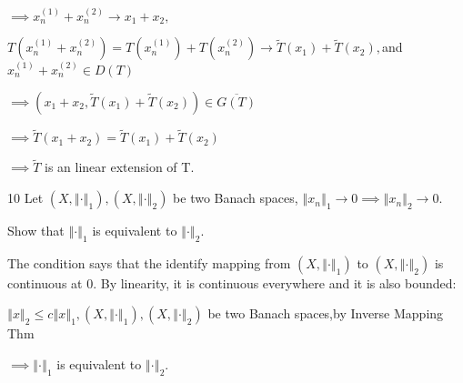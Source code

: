 \documentclass{ctexart}
\begin{document}
$\implies x_{n}^{\left( 1\right) }+x_{n}^{\left( 2\right) }\rightarrow
x_{1}+x_{2},$

$T\left( x_{n}^{\left( 1\right) }+x_{n}^{\left( 2\right) }\right) =T\left(
x_{n}^{\left( 1\right) }\right) +T\left( x_{n}^{\left( 2\right) }\right)
\rightarrow \tilde{T}\left( x_{1}\right) +\tilde{T}\left( x_{2}\right) ,$and 
$x_{n}^{\left( 1\right) }+x_{n}^{\left( 2\right) }\in D\left( T\right) $

$\implies \left( x_{1}+x_{2},\tilde{T}\left( x_{1}\right) +\tilde{T}\left(
x_{2}\right) \right) \in \overline{G\left( T\right) }$

$\implies \tilde{T}\left( x_{1}+x_{2}\right) =\tilde{T}\left( x_{1}\right) +%
\tilde{T}\left( x_{2}\right) $

$\implies \tilde{T}$ is an linear extension of T.

10 Let $\left( X,\left\Vert \cdot \right\Vert _{1}\right) ,\left(
X,\left\Vert \cdot \right\Vert _{2}\right) $ be two Banach spaces, $%
\left\Vert x_{n}\right\Vert _{1}\rightarrow 0\implies \left\Vert
x_{n}\right\Vert _{2}\rightarrow 0.$

Show that $\left\Vert \cdot \right\Vert _{1}$ is equivalent to $\left\Vert
\cdot \right\Vert _{2}.$

The condition says that the identify mapping from $\left( X,\left\Vert \cdot
\right\Vert _{1}\right) $ to $\left( X,\left\Vert \cdot \right\Vert
_{2}\right) $ is continuous at 0. By linearity, it is continuous everywhere
and it is also bounded:

$\left\Vert x\right\Vert _{2}\leq c\left\Vert x\right\Vert _{1},\left(
X,\left\Vert \cdot \right\Vert _{1}\right) ,\left( X,\left\Vert \cdot
\right\Vert _{2}\right) $ be two Banach spaces,by Inverse Mapping Thm

$\implies \left\Vert \cdot \right\Vert _{1}$ is equivalent to $\left\Vert
\cdot \right\Vert _{2}.$
\end{document}
